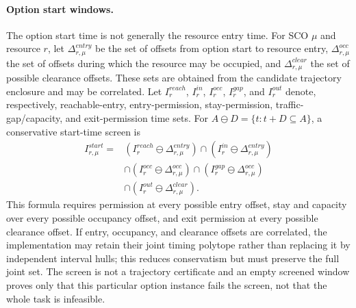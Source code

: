 \documentclass[letterpaper]{article} %
\begin{document}
\paragraph{Option start windows.}
The option start time is not generally the resource entry time. For SCO $\mu$ and resource $r$, let $\Delta_{r,\mu}^{entry}$ be the set of offsets from option start to resource entry, $\Delta_{r,\mu}^{occ}$ the set of offsets during which the resource may be occupied, and $\Delta_{r,\mu}^{clear}$ the set of possible clearance offsets. These sets are obtained from the candidate trajectory enclosure and may be correlated. Let $I_{r}^{reach}$, $I_r^{in}$, $I_r^{occ}$, $I_r^{gap}$, and $I_r^{out}$ denote, respectively, reachable-entry, entry-permission, stay-permission, traffic-gap/capacity, and exit-permission time sets. For $A\ominus D=\{t:t+D\subseteq A\}$, a conservative start-time screen is
\begin{equation}
\begin{aligned}
I_{r,\mu}^{start}={}&
(I_r^{reach}\ominus\Delta_{r,\mu}^{entry})
\cap(I_r^{in}\ominus\Delta_{r,\mu}^{entry})\\
&\cap(I_r^{occ}\ominus\Delta_{r,\mu}^{occ})
\cap(I_r^{gap}\ominus\Delta_{r,\mu}^{occ})\\
&\cap(I_r^{out}\ominus\Delta_{r,\mu}^{clear}).
\end{aligned}
\label{eq:window}
\end{equation}
This formula requires permission at every possible entry offset, stay and capacity over every possible occupancy offset, and exit permission at every possible clearance offset. If entry, occupancy, and clearance offsets are correlated, the implementation may retain their joint timing polytope rather than replacing it by independent interval hulls; this reduces conservatism but must preserve the full joint set. The screen is not a trajectory certificate and an empty screened window proves only that this particular option instance fails the screen, not that the whole task is infeasible.
\end{document}
